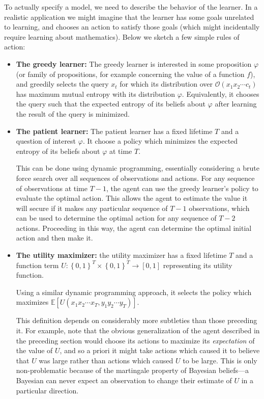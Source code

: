\documentclass[12pt]{article}
\theoremstyle{definition}
\renewcommand{\O}{\mathcal{O}}
\newcommand{\Of}[1]{\O\of{#1}}
\newcommand{\of}[1]{\left(#1\right)}
\renewcommand{\b}[1]{\left\{#1\right\}}
\newcommand{\E}[1]{\mathbb{E}\left[#1\right]}
\newcommand{\vp}{\varphi}
\begin{document}
To actually specify a model, we need to describe the behavior of the learner.
In a realistic application we might imagine that the learner
has some goals unrelated to learning, and chooses an action to satisfy those
goals (which might incidentally require learning about mathematics).
Below we sketch a few simple rules of action:

\begin{itemize}
\item \textbf{The greedy learner:}
The greedy learner is interested in some proposition $\vp$
(or family of propositions, for example concerning the value of a function $f$),
and greedily selects the query $x_t$ for which its distribution
over $\Of{x_1 x_2 \cdots c_t}$ has maximum mutual entropy with its distribution $\vp$.
Equivalently, it chooses the query such that the expected entropy of its beliefs about $\vp$
after learning the result of the query
is minimized.
\item \textbf{The patient learner:} The patient learner has a fixed lifetime $T$
and a question of interest $\vp$.
It choose a policy which minimizes the expected entropy of its beliefs about $\vp$
at time $T$.

This can be done using dynamic programming,
essentially considering a brute force search over all sequences of observations
and actions.
For any sequence of observations at time $T-1$, the agent can use the greedy learner's
policy to evaluate the optimal action.
This allows the agent to estimate the value it will secure if it makes any particular
sequence of $T-1$ observations,
which can be used to determine the optimal action for any sequence of $T-2$
actions.
Proceeding in this way, the agent can determine the optimal initial
action and then make it.
\item \textbf{The utility maximizer:} the utility maximizer has a fixed
lifetime $T$ and a function term $U : \b{0, 1}^T \times \b{0, 1}^T \rightarrow [0, 1]$
representing its utility function.

Using a similar dynamic programming approach, it selects the policy
which maximizes $\E{U\of{x_1 x_2 \cdots x_T, y_1 y_2 \cdots y_T}}$.

This definition depends on considerably more subtleties than those preceding it.
For example, note that the obvious generalization of the agent
described in the preceding section would choose its actions to maximize 
its \emph{expectation} 
of the value of $U$, and so a priori it might take actions
which caused it to believe that $U$ was large rather than actions which caused $U$ to
be large. This is only non-problematic because of the martingale property of 
Bayesian beliefs---a Bayesian can never expect an observation to change their estimate of $U$
in a particular direction. %


\end{itemize}
\end{document}
